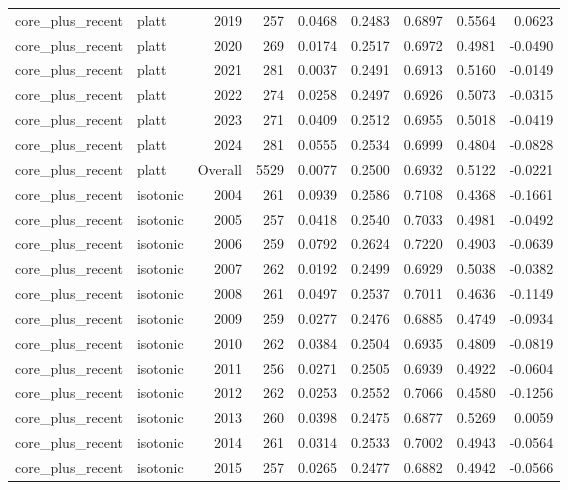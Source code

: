 \begin{table}[t]
\begin{tabular}{@{} l l r r r r r r r @{} }
      core\_plus\_recent & platt & 2019 & 257 & 0.0468 & 0.2483 & 0.6897 & 0.5564 & 0.0623 \\
      core\_plus\_recent & platt & 2020 & 269 & 0.0174 & 0.2517 & 0.6972 & 0.4981 & -0.0490 \\
      core\_plus\_recent & platt & 2021 & 281 & 0.0037 & 0.2491 & 0.6913 & 0.5160 & -0.0149 \\
      core\_plus\_recent & platt & 2022 & 274 & 0.0258 & 0.2497 & 0.6926 & 0.5073 & -0.0315 \\
      core\_plus\_recent & platt & 2023 & 271 & 0.0409 & 0.2512 & 0.6955 & 0.5018 & -0.0419 \\
      core\_plus\_recent & platt & 2024 & 281 & 0.0555 & 0.2534 & 0.6999 & 0.4804 & -0.0828 \\
      core\_plus\_recent & platt & Overall & 5529 & 0.0077 & 0.2500 & 0.6932 & 0.5122 & -0.0221 \\
      core\_plus\_recent & isotonic & 2004 & 261 & 0.0939 & 0.2586 & 0.7108 & 0.4368 & -0.1661 \\
      core\_plus\_recent & isotonic & 2005 & 257 & 0.0418 & 0.2540 & 0.7033 & 0.4981 & -0.0492 \\
      core\_plus\_recent & isotonic & 2006 & 259 & 0.0792 & 0.2624 & 0.7220 & 0.4903 & -0.0639 \\
      core\_plus\_recent & isotonic & 2007 & 262 & 0.0192 & 0.2499 & 0.6929 & 0.5038 & -0.0382 \\
      core\_plus\_recent & isotonic & 2008 & 261 & 0.0497 & 0.2537 & 0.7011 & 0.4636 & -0.1149 \\
      core\_plus\_recent & isotonic & 2009 & 259 & 0.0277 & 0.2476 & 0.6885 & 0.4749 & -0.0934 \\
      core\_plus\_recent & isotonic & 2010 & 262 & 0.0384 & 0.2504 & 0.6935 & 0.4809 & -0.0819 \\
      core\_plus\_recent & isotonic & 2011 & 256 & 0.0271 & 0.2505 & 0.6939 & 0.4922 & -0.0604 \\
      core\_plus\_recent & isotonic & 2012 & 262 & 0.0253 & 0.2552 & 0.7066 & 0.4580 & -0.1256 \\
      core\_plus\_recent & isotonic & 2013 & 260 & 0.0398 & 0.2475 & 0.6877 & 0.5269 & 0.0059 \\
      core\_plus\_recent & isotonic & 2014 & 261 & 0.0314 & 0.2533 & 0.7002 & 0.4943 & -0.0564 \\
      core\_plus\_recent & isotonic & 2015 & 257 & 0.0265 & 0.2477 & 0.6882 & 0.4942 & -0.0566 \\

\end{tabular}
\end{table}
